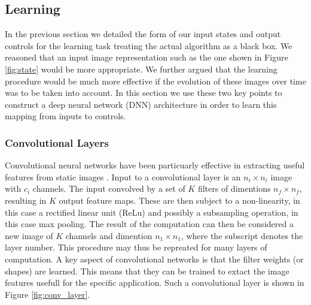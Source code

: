 \documentclass[a4paper,11pt]{report}
\begin{document}
\subsection{Learning} \label{sec:dnn_arch}

In the previous section we detailed the form of our input states and output controls for the learning task treating the actual algorithm as a black box. We reasoned that an input image representation such as the one shown in Figure \ref{fig:state} would be more appropriate. We further argued that the learning procedure would be much more effective if the evolution of these images over time was to be taken into account. In this section we use these two key points to construct a deep neural network (DNN) architecture in order to learn this mapping from inputs to controls.

\subsubsection{Convolutional Layers}
Convolutional neural networks have been particuarly effective in extracting useful features from static images \cite{krizhevsky2012imagenet}. Input to a convolutional layer is an $n_i \times n_i$ image with $c_i$ channels. The input convolved by a set of $K$ filters of dimentions $n_f \times n_f$, resulting in $K$ output feature maps. These are then subject to a non-linearity, in this case a rectified linear unit (ReLu) and possibly a subsampling operation, in this case max pooling. The result of the computation can then be considered a new image of $K$ channels and dimention $n_1 \times n_1$, where the subscript denotes the layer number. This procedure may thus be repreated for many layers of computation. A key aspect of convolutional networks is that the filter weights (or shapes) are learned. This means that they can be trained to extact the image features usefull for the specific application. Such a convolutional layer is shown in Figure \ref{fig:conv_layer}.
\end{document}
